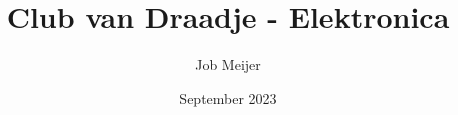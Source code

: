 \documentclass[a4paper,12pt]{book}
\begin{document}
\author{Job Meijer}
\title{Club van Draadje - Elektronica}
\date{September 2023}

\frontmatter
\maketitle
\tableofcontents

\mainmatter




\backmatter
\end{document}
